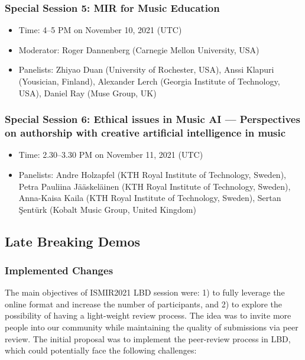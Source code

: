 \documentclass[%
10pt,								%
titlepage,						%
]
{scrartcl}
\begin{document}
        \subsubsection{Special Session 5: MIR for Music Education}
        \begin{itemize}
            \item   Time: 4--5 PM on November 10, 2021 (UTC)
            \item   Moderator: Roger Dannenberg (Carnegie Mellon University, USA)
            \item   Panelists: Zhiyao Duan (University of Rochester, USA), Anssi Klapuri (Yousician, Finland), Alexander Lerch (Georgia Institute of Technology, USA), Daniel Ray (Muse Group, UK)

        \end{itemize}

        \subsubsection{Special Session 6: Ethical issues in Music AI --- Perspectives on authorship with creative artificial intelligence in music}
        \begin{itemize}
            \item   Time: 2.30--3.30 PM on November 11, 2021 (UTC)
            \item   Panelists: Andre Holzapfel (KTH Royal Institute of Technology, Sweden), Petra Pauliina J\"a\"askel\"ainen (KTH Royal Institute of Technology, Sweden), Anna-Kaisa Kaila (KTH Royal Institute of Technology, Sweden), Sertan \c{S}ent\"urk (Kobalt Music Group, United Kingdom) 
        \end{itemize}

    \subsection{Late Breaking Demos}
        \subsubsection{Implemented Changes}
            The main objectives of ISMIR2021 LBD session were: 1) to fully leverage the online format and increase the number of participants, and 2) to explore the possibility of having a light-weight review process. The idea was to invite more people into our community while maintaining the quality of submissions via peer review. The initial proposal was to implement the peer-review process in LBD, which could potentially face the following challenges:
\end{document}
